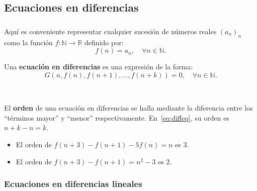 \subsection{Ecuaciones en diferencias}

\begin{frame}
\frametitle{\subsecname}

Aquí es conveniente representar cualquier sucesión de números reales $(a_{n})_{n} $ como la función $f\colon\mathds{N}\rightarrow\mathds{R}$ definido por: \[ f(n)=a_{n},\quad\forall n\in\mathds{N}. \]

\begin{definition}
Una \textbf{ecuación en diferencias} es una expresión de la forma:
	\begin{equation}\label{eq:diffeq}
		G\left(n,f(n),f\left(n+1\right),\ldots,f\left(n+k\right)\right)=0,\quad\forall n\in\mathds{N}.
	\end{equation}
\end{definition}

\

El \textbf{orden} de una ecuación en diferencias se halla mediante la diferencia entre los ``términos mayor'' y ``menor'' respectivamente. En~\eqref{eq:diffeq}, su orden es \alert{$n+k-n=k$}.%

\begin{example}
	\begin{itemize}
		\item El \alert{orden} de $f\left(n+3\right)-f\left(n+1\right)-5f(n)=n$ es \alert{$3$}.
		\item El \alert{orden} de $f\left(n+3\right)-f\left(n+1\right)=n^{2}-3$ es \alert{$2$}.
	\end{itemize}
\end{example}
\end{frame}

\subsubsection{Ecuaciones en diferencias lineales}

